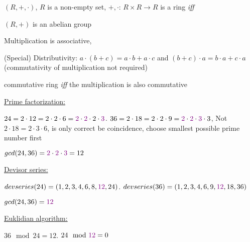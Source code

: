 \documentclass[landscape, a4paper]{article}
\begin{document}
\begin{minipage}[t]{0.2\linewidth}
\begin{betterlist}
\begin{betterlist}
\begin{betterlist}
\begin{betterlist}
					\item $(R, +, \cdot)$, $R$ is a non-empty set, $+,\cdot$: $R \times R \rightarrow R$ is a \alert{ring} \textit{iff}
					\begin{betterlist}
						\item $(R, +)$ is an \alert{abelian group}
						\item \alert{Multiplication} is \alert{associative},
						\item \alert{(Special) Distributivity}: $a \cdot (b + c) = a \cdot b + a \cdot c$ and $(b + c)\cdot a = b \cdot a + c\cdot  a$ (commutativity of multiplication not required)
					\end{betterlist}
					\item \alert{commutative ring} \textit{iff} the multiplication is also commutative
				\end{betterlist}
			\end{betterlist}
		\end{betterlist}
		\begin{betterlist}
			\item \underline{Prime factorization:}
			\begin{betterlist}
				\item $24 = 2\cdot 12 = 2\cdot 2\cdot 6 = \textcolor{PrimaryColor}{2}\cdot \textcolor{PrimaryColor}{2}\cdot 2\cdot \textcolor{PrimaryColor}{3}$. $36 = 2\cdot 18 = 2\cdot 2\cdot 9 = \textcolor{PrimaryColor}{2}\cdot \textcolor{PrimaryColor}{2}\cdot \textcolor{PrimaryColor}{3}\cdot 3$, Not $2\cdot 18 = 2 \cdot 3\cdot 6$, is only correct be coincidence, choose smallest possible prime number first
				\item $gcd(24, 36) = \textcolor{PrimaryColor}{2}\cdot \textcolor{PrimaryColor}{2}\cdot \textcolor{PrimaryColor}{3} = 12$
			\end{betterlist}
			\item \underline{Devisor series:}
			\begin{betterlist}
				\item $devseries(24) = (1, 2, 3, 4, 6, 8, \textcolor{PrimaryColor}{12}, 24)$. $devseries(36) = (1, 2, 3, 4, 6, 9, \textcolor{PrimaryColor}{12}, 18, 36)$
				\item $gcd(24, 36) = \textcolor{PrimaryColor}{12}$
			\end{betterlist}
			\item \underline{Euklidian algorithm:}
			\begin{betterlist}
				\item $36\mod 24 = 12$. $24\mod \textcolor{PrimaryColor}{12} = 0$

\end{betterlist}
\end{betterlist}
\end{betterlist}
\end{minipage}
\end{document}
